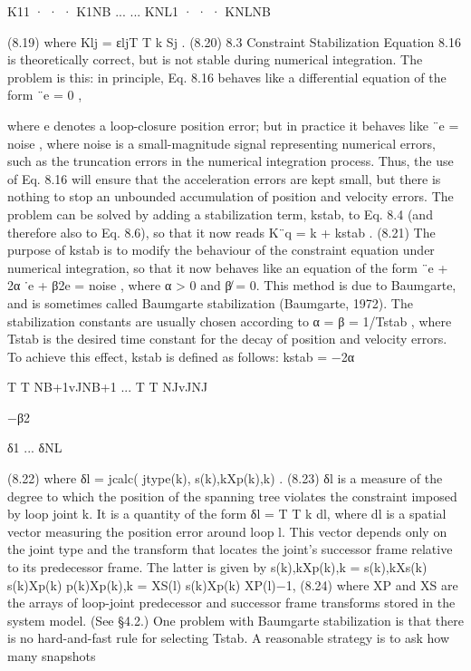 K11 · · · K1NB ... ... KNL1 · · · KNLNB

(8.19) where Klj = εljT T k Sj . (8.20) 8.3 Constraint Stabilization Equation 8.16 is theoretically correct, but is not stable during numerical integration. The problem is this: in principle, Eq. 8.16 behaves like a differential equation of the form ¨e = 0 ,

where e denotes a loop-closure position error; but in practice it behaves like ¨e = noise , where noise is a small-magnitude signal representing numerical errors, such as the truncation errors in the numerical integration process. Thus, the use of Eq. 8.16 will ensure that the acceleration errors are kept small, but there is nothing to stop an unbounded accumulation of position and velocity errors. The problem can be solved by adding a stabilization term, kstab, to Eq. 8.4 (and therefore also to Eq. 8.6), so that it now reads K¨q = k + kstab . (8.21) The purpose of kstab is to modify the behaviour of the constraint equation under numerical integration, so that it now behaves like an equation of the form ¨e + 2α ˙e + β2e = noise , where α > 0 and β̸ = 0. This method is due to Baumgarte, and is sometimes called Baumgarte stabilization (Baumgarte, 1972). The stabilization constants are usually chosen according to α = β = 1/Tstab , where Tstab is the desired time constant for the decay of position and velocity errors. To achieve this effect, kstab is defined as follows: kstab = −2α

T T NB+1vJNB+1 ... T T NJvJNJ

−β2

δ1 ... δNL

(8.22) where δl = jcalc( jtype(k), s(k),kXp(k),k) . (8.23) δl is a measure of the degree to which the position of the spanning tree violates the constraint imposed by loop joint k. It is a quantity of the form δl = T T k dl, where dl is a spatial vector measuring the position error around loop l. This vector depends only on the joint type and the transform that locates the joint’s successor frame relative to its predecessor frame. The latter is given by s(k),kXp(k),k = s(k),kXs(k) s(k)Xp(k) p(k)Xp(k),k = XS(l) s(k)Xp(k) XP(l)−1, (8.24) where XP and XS are the arrays of loop-joint predecessor and successor frame transforms stored in the system model. (See §4.2.) One problem with Baumgarte stabilization is that there is no hard-and-fast rule for selecting Tstab. A reasonable strategy is to ask how many snapshots


